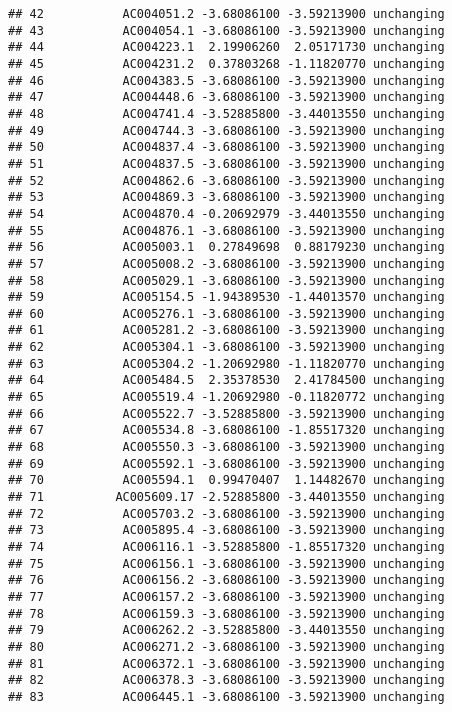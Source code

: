 \documentclass[]{article}
\begin{document}
\begin{verbatim}
## 42           AC004051.2 -3.68086100 -3.59213900 unchanging
## 43           AC004054.1 -3.68086100 -3.59213900 unchanging
## 44           AC004223.1  2.19906260  2.05171730 unchanging
## 45           AC004231.2  0.37803268 -1.11820770 unchanging
## 46           AC004383.5 -3.68086100 -3.59213900 unchanging
## 47           AC004448.6 -3.68086100 -3.59213900 unchanging
## 48           AC004741.4 -3.52885800 -3.44013550 unchanging
## 49           AC004744.3 -3.68086100 -3.59213900 unchanging
## 50           AC004837.4 -3.68086100 -3.59213900 unchanging
## 51           AC004837.5 -3.68086100 -3.59213900 unchanging
## 52           AC004862.6 -3.68086100 -3.59213900 unchanging
## 53           AC004869.3 -3.68086100 -3.59213900 unchanging
## 54           AC004870.4 -0.20692979 -3.44013550 unchanging
## 55           AC004876.1 -3.68086100 -3.59213900 unchanging
## 56           AC005003.1  0.27849698  0.88179230 unchanging
## 57           AC005008.2 -3.68086100 -3.59213900 unchanging
## 58           AC005029.1 -3.68086100 -3.59213900 unchanging
## 59           AC005154.5 -1.94389530 -1.44013570 unchanging
## 60           AC005276.1 -3.68086100 -3.59213900 unchanging
## 61           AC005281.2 -3.68086100 -3.59213900 unchanging
## 62           AC005304.1 -3.68086100 -3.59213900 unchanging
## 63           AC005304.2 -1.20692980 -1.11820770 unchanging
## 64           AC005484.5  2.35378530  2.41784500 unchanging
## 65           AC005519.4 -1.20692980 -0.11820772 unchanging
## 66           AC005522.7 -3.52885800 -3.59213900 unchanging
## 67           AC005534.8 -3.68086100 -1.85517320 unchanging
## 68           AC005550.3 -3.68086100 -3.59213900 unchanging
## 69           AC005592.1 -3.68086100 -3.59213900 unchanging
## 70           AC005594.1  0.99470407  1.14482670 unchanging
## 71          AC005609.17 -2.52885800 -3.44013550 unchanging
## 72           AC005703.2 -3.68086100 -3.59213900 unchanging
## 73           AC005895.4 -3.68086100 -3.59213900 unchanging
## 74           AC006116.1 -3.52885800 -1.85517320 unchanging
## 75           AC006156.1 -3.68086100 -3.59213900 unchanging
## 76           AC006156.2 -3.68086100 -3.59213900 unchanging
## 77           AC006157.2 -3.68086100 -3.59213900 unchanging
## 78           AC006159.3 -3.68086100 -3.59213900 unchanging
## 79           AC006262.2 -3.52885800 -3.44013550 unchanging
## 80           AC006271.2 -3.68086100 -3.59213900 unchanging
## 81           AC006372.1 -3.68086100 -3.59213900 unchanging
## 82           AC006378.3 -3.68086100 -3.59213900 unchanging
## 83           AC006445.1 -3.68086100 -3.59213900 unchanging

\end{verbatim}
\end{document}
